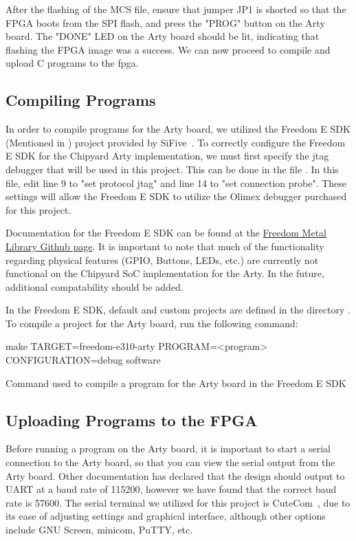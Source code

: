 After the flashing of the MCS file, ensure that jumper JP1 is shorted so that the FPGA boots from the SPI flash, and press the "PROG" button on the Arty board.
The "DONE" LED on the Arty board should be lit, indicating that flashing the FPGA image was a success.
We can now proceed to compile and upload C programs to the \Gls{fpga}.

\subsection{Compiling Programs}\label{sec:Compiling_Programs}
In order to compile programs for the Arty board, we utilized the Freedom E SDK (Mentioned in ) project provided by SiFive~\cite{freedomESDK}.
To correctly configure the Freedom E SDK for the Chipyard Arty implementation, we must first specify the \Gls{jtag} debugger that will be used in this project.
This can be done in the file .
In this file, edit line 9 to "set protocol jtag" and line 14 to "set connection probe".
These settings will allow the Freedom E SDK to utilize the Olimex debugger purchased for this project.

Documentation for the Freedom E SDK can be found at the \href{https://sifive.github.io/freedom-metal-docs/}{Freedom Metal Library Github page}.
It is important to note that much of the functionality regarding physical features (GPIO, Buttons, LEDs, etc.) are currently not functional on the Chipyard SoC implementation for the Arty.
In the future, additional compatability should be added.

In the Freedom E SDK, default and custom projects are defined in the directory .
To compile a project for the Arty board, run the following command:

\begin{listing}[h!tbp]
  \begin{bashsource}
    make TARGET=freedom-e310-arty PROGRAM=<program> CONFIGURATION=debug software
  \end{bashsource}
  \caption{Command used to compile a program for the Arty board in the Freedom E SDK}
  \label{lst:compile_in_sdk}
\end{listing}

\subsection{Uploading Programs to the FPGA}\label{sec:Upload_Programs_to_Flashed_FPGA}
Before running a program on the Arty board, it is important to start a serial connection to the Arty board, so that you can view the serial output from the Arty board.
Other documentation has declared that the design should output to UART at a baud rate of 115200, however we have found that the correct baud rate is 57600.
The serial terminal we utilized for this project is CuteCom~\cite{CuteCom}, due to its ease of adjusting settings and graphical interface, although other options include GNU Screen, minicom, PuTTY, etc.

